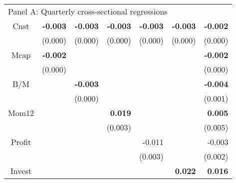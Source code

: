 \begin{singlespacing}
\begin{table}[H]
{\begin{tabular}{crrrrrr}
\hline
\multicolumn{7}{l}{Panel A:  Quarterly cross-sectional regressions}                                                                                                                          \\
Cnst   & \textbf{-0.003}      & \textbf{-0.003}      & \textbf{-0.003}      & \textbf{-0.003}             & \textbf{-0.003}                    & \textbf{-0.002}             \\
       & (0.000)              & (0.000)              & (0.000)              & (0.000)                     & (0.000)                            & (0.000)                     \\
Mcap   & \textbf{-0.002}      &                      &                      &                             &                                    & \textbf{-0.002}             \\
       & (0.000)              &                      &                      &                             &                                    & (0.000)                     \\
B/M    &                      & \textbf{-0.003}      &                      &                             &                                    & \textbf{-0.004}             \\
       &                      & (0.000)              &                      &                             &                                    & (0.001)                     \\
Mom12  &                      &                      & \textbf{0.019}       &                             &                                    & \textbf{0.005}                       \\
       &                      &                      & (0.003)              &                             &                                    & (0.005)                     \\
Profit &                      &                      &                      & -0.011                      &                                    & -0.003                      \\
       &                      &                      &                      & (0.003)                     &                                    & (0.002)                     \\
Invest &                      &                      &                      &                             & \textbf{0.022}                     & \textbf{0.016}              \\

\end{tabular}}
\end{table}
\end{singlespacing}

